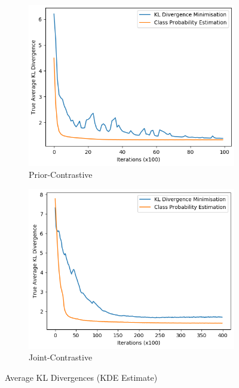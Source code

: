 \documentclass[honours,12pt]{unswthesis}
\numberwithin{equation}{section}
\theoremstyle{definition}
\begin{document}
\newpage
\begin{figure}[t!]
\begin{subfigure}{0.49\textwidth}
\includegraphics[width=\linewidth]{truklmins/PCKLvsPCADV.png}
\caption{Prior-Contrastive}
\end{subfigure}
\begin{subfigure}{0.49\textwidth}
\includegraphics[width=\linewidth]{truklmins/JCKLvsJCADV.png}
\caption{Joint-Contrastive}
\end{subfigure}
\caption{Average KL Divergences (KDE Estimate)}
\end{figure}
\end{document}
